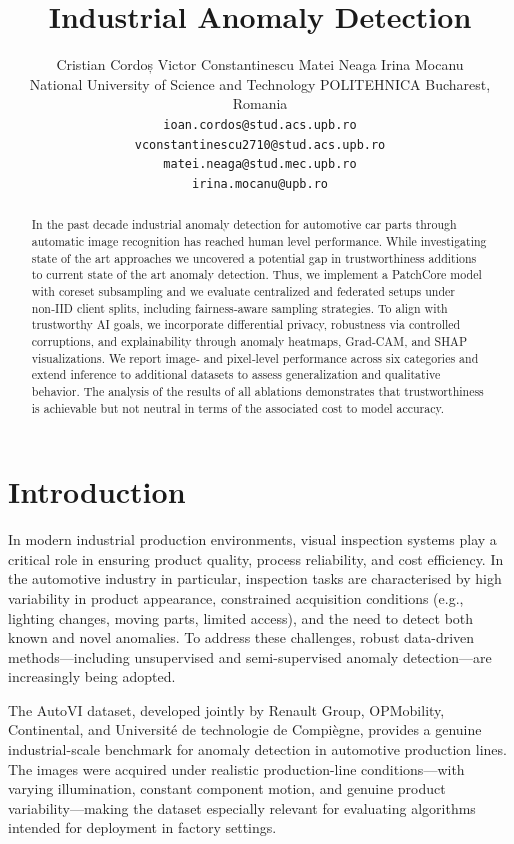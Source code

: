 \documentclass{article}
\title{Industrial Anomaly Detection}
\author{
    Cristian Cordoș \quad Victor Constantinescu \quad  Matei Neaga \quad Irina Mocanu \\
    National University of Science and Technology POLITEHNICA Bucharest, Romania \\
    \texttt{ioan.cordos@stud.acs.upb.ro} \\
    \texttt{vconstantinescu2710@stud.acs.upb.ro} \\
    \texttt{matei.neaga@stud.mec.upb.ro} \\
    \texttt{irina.mocanu@upb.ro}
}
\begin{document}
\maketitle

\begin{abstract}
In the past decade industrial anomaly detection for automotive car parts through automatic image recognition has reached human level performance. While investigating state of the art approaches we uncovered a potential gap in trustworthiness additions to current state of the art anomaly detection. Thus, we implement a PatchCore model with coreset subsampling and we evaluate centralized and federated setups under non‑IID client splits, including fairness‑aware sampling strategies. To align with trustworthy AI goals, we incorporate differential privacy, robustness via controlled corruptions, and explainability through anomaly heatmaps, Grad‑CAM, and SHAP visualizations. We report image‑ and pixel‑level performance across six categories and extend inference to additional datasets to assess generalization and qualitative behavior. The analysis of the results of all ablations demonstrates that trustworthiness is achievable but not neutral in terms of the associated cost to model accuracy.

\end{abstract}
\tableofcontents
\newpage

\section{Introduction}

In modern industrial production environments, visual inspection systems play a critical role in ensuring product quality, process reliability, and cost efficiency. In the automotive industry in particular, inspection tasks are characterised by high variability in product appearance, constrained acquisition conditions (e.g., lighting changes, moving parts, limited access), and the need to detect both known and novel anomalies. To address these challenges, robust data-driven methods—including unsupervised and semi-supervised anomaly detection—are increasingly being adopted.

The AutoVI dataset, developed jointly by Renault Group, OPMobility, Continental, and Université de technologie de Compiègne, provides a genuine industrial-scale benchmark for anomaly detection in automotive production lines. The images were acquired under realistic production-line conditions—with varying illumination, constant component motion, and genuine product variability—making the dataset especially relevant for evaluating algorithms intended for deployment in factory settings.
\end{document}
